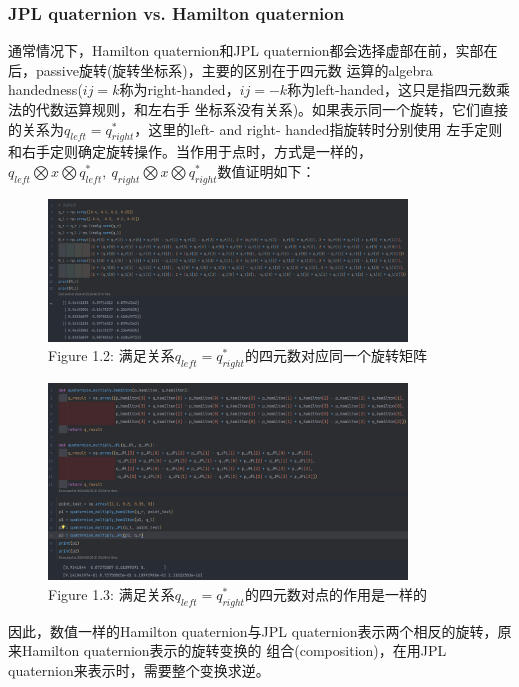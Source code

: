 \documentclass[a4paper, UTF8, fontset=adobe]{ctexart}
\begin{document}
\subsubsection{JPL quaternion vs. Hamilton quaternion}
通常情况下，Hamilton quaternion和JPL quaternion都会选择虚部在前，实部在后，passive旋转(旋转坐标系)，主要的区别在于四元数
运算的algebra handedness($ij=k$称为right-handed，$ij=-k$称为left-handed，这只是指四元数乘法的代数运算规则，和左右手
坐标系没有关系)。如果表示同一个旋转，它们直接的关系为$q_{left}=q^*_{right}$，这里的left- and right- handed指旋转时分别使用
左手定则和右手定则确定旋转操作。当作用于点时，方式是一样的，$q_{left} \bigotimes x \bigotimes q^*_{left}, \ 
q_{right} \bigotimes x \bigotimes q^*_{right}$数值证明如下：

\begin{figure}[ht]
\centering
\includegraphics[width=0.85\textwidth]{figures/quaternion_comp1.png}
\captionsetup{labelformat=empty}
\caption{Figure 1.2: 满足关系$q_{left}=q^*_{right}$的四元数对应同一个旋转矩阵}
\end{figure}

\begin{figure}[ht]
\centering
\includegraphics[width=0.85\textwidth]{figures/quaternion_comp2.png}
\captionsetup{labelformat=empty}
\caption{Figure 1.3: 满足关系$q_{left}=q^*_{right}$的四元数对点的作用是一样的}
\end{figure}

\noindent 因此，数值一样的Hamilton quaternion与JPL quaternion表示两个相反的旋转，原来Hamilton quaternion表示的旋转变换的
组合(composition)，在用JPL quaternion来表示时，需要整个变换求逆。
\end{document}
